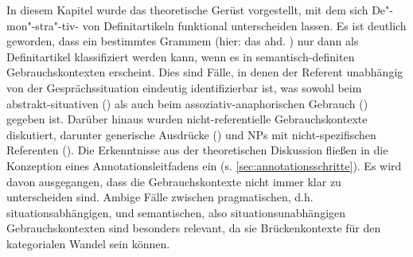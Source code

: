 In diesem Kapitel wurde das theoretische Gerüst vorgestellt, mit dem sich De"-mon"-stra"-tiv- von Definitartikeln funktional unterscheiden lassen. Es ist deutlich geworden, dass ein bestimmtes Grammem (hier: das ahd. ) nur dann als Definitartikel klassifiziert werden kann, wenn es in semantisch-definiten Gebrauchskontexten \parencite{Lobner1985} erscheint. Dies sind Fälle, in denen der Referent unabhängig von der Gesprächssituation eindeutig identifizierbar ist, was  sowohl beim abstrakt-situativen () als auch beim assoziativ-anaphorischen Gebrauch () gegeben ist. Darüber hinaus wurden nicht-referentielle Gebrauchskontexte diskutiert, darunter generische Ausdrücke () und NPs mit nicht-spezifischen Referenten (). Die Erkenntnisse aus der theoretischen Diskussion fließen in die Konzeption eines Annotationsleitfadens ein (s. \ref{sec:annotationsschritte}). Es wird davon ausgegangen, dass die Gebrauchskontexte nicht immer klar zu unterscheiden sind. Ambige Fälle zwischen pragmatischen, d.h. situationsabhängigen, und semantischen, also situationsunabhängigen Gebrauchskontexten sind besonders relevant, da sie Brückenkontexte für den kategorialen Wandel sein können. 
